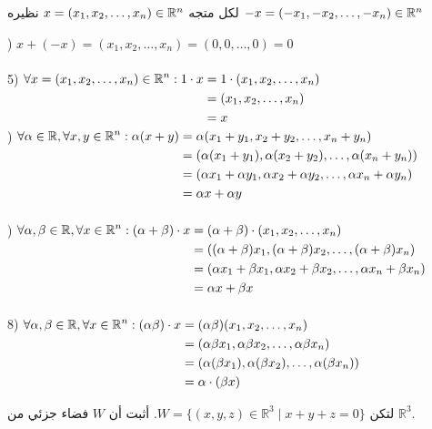 \noindent
لكل متجه $x = (x_1, x_2, \dots, x_n) \in \mathbb{R}^n$ نظيره $-x = (-x_1, -x_2, \dots, -x_n) \in \mathbb{R}^n$

) $x + (-x) = (x_1, x_2, \dots, x_n)= (0, 0, \dots, 0) = 0$ \\ 
\\
5) $
\begin{aligned}[t]
	\forall x = (x_1, x_2, \dots, x_n) \in \mathbb{R}^n: 1\cdot x
	&= 1 \cdot (x_1, x_2, \dots, x_n)\\
	&= (x_1, x_2, \dots, x_n) \\
	&= x
\end{aligned}
$\\
) $
\begin{aligned}[t]
	\forall \alpha\in\mathbb{R} , \forall x,y \in \mathbb{R}^n: \alpha (x+y)
	&= \alpha(x_1+y_1, x_2+y_2, \dots, x_n+y_n)\\
	&= (\alpha(x_1+y_1), \alpha(x_2+y_2), \dots, \alpha(x_n+y_n))\\
	&= (\alpha x_1+\alpha y_1, \alpha x_2+\alpha y_2, \dots, \alpha x_n+\alpha y_n)\\
	&= \alpha x + \alpha y
\end{aligned}
$\\\\
) $
\begin{aligned}[t]
	\forall \alpha, \beta \in \mathbb{R}, \forall x\in \mathbb{R}^n: (\alpha + \beta)\cdot x
	&= (\alpha + \beta)\cdot (x_1, x_2, \dots, x_n)\\
	&= ((\alpha+\beta)x_1, (\alpha+\beta)x_2, \dots, (\alpha+\beta)x_n)\\
	&= (\alpha x_1 + \beta x_1, \alpha x_2 + \beta x_2, \dots , \alpha x_n + \beta x_n)\\
	&= \alpha x + \beta x
\end{aligned}
$\\
\\
8) $
\begin{aligned}[t]
	\forall \alpha, \beta \in \mathbb{R}, \forall x\in \mathbb{R}^n: (\alpha \beta)\cdot x
	&= (\alpha\beta)(x_1, x_2, \dots, x_n)\\
	&= (\alpha\beta x_1, \alpha\beta x_2, \dots, \alpha\beta x_n)\\
	&= (\alpha(\beta x_1), \alpha(\beta x_2), \dots, \alpha(\beta x_n))\\
	&= \alpha \cdot (\beta x)
\end{aligned}
$
\begin{example}
	لتكن $W = \{ (x, y, z) \in \mathbb{R}^3 \mid x + y + z = 0 \}$. أثبت أن $W$ فضاء جزئي من $\mathbb{R}^3$.
\end{example}

